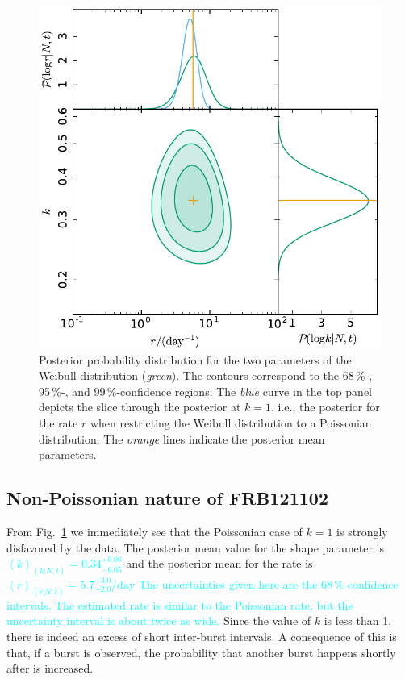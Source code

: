 \documentclass[fleqn,usenatbib]{mnras}
\newcommand{\new}[1]{\textcolor{cyan}{#1}}
\begin{document}
\begin{figure}
	\includegraphics[width=1.0\columnwidth]{2dpost.pdf}
	\caption{\label{fig:result}Posterior probability distribution for the two parameters of the Weibull distribution (\emph{green}). The contours correspond to the 68\,\%-, 95\,\%-, and 99\,\%-confidence regions. The \emph{blue} curve in the top panel depicts the slice through the posterior at $k=1$, i.e., the posterior for the rate $r$ when restricting the Weibull distribution to a Poissonian distribution. The \emph{orange} lines indicate the posterior mean parameters.}
\end{figure}


\subsection{Non-Poissonian nature of FRB121102}
\label{sec:non-poissonian}

From Fig.~\ref{fig:result} we immediately see that the Poissonian case of $k=1$ is strongly disfavored by the data. The posterior mean value for the shape parameter is \new{$\left<k\right>_{(k|N,t)} = 0.34^{+0.06}_{-0.05}$} and the posterior mean for the rate is \new{$\left<r\right>_{(r|N,t)} = 5.7^{+3.0}_{-2.0}/\mathrm{day}$ The uncertainties given here are the 68\,\% confidence intervals. The estimated rate is similar to the Poissonian rate, but the uncertainty interval is about twice as wide.} Since the value of $k$ is less than 1, there is indeed an excess of short inter-burst intervals. A consequence of this is that, if a burst is observed, the probability that another burst happens shortly after is increased.
\end{document}
